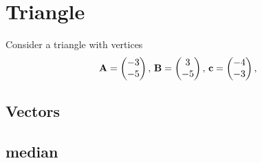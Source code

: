 \documentclass[11pt]{book}
\begin{document}
\frontmatter
\tableofcontents
\setcounter{page}{1}
\mainmatter
\chapter{Triangle}
Consider a triangle with vertices
\begin{align}
\label{eq:tri-pts}
\vec{A}=\myvec{-3 \\ -5},\,
\vec{B}=\myvec{3\\-5},\,
	\vec{c}=\myvec{-4\\-3},\,
\end{align}

\section{Vectors}
\section{median}
\end{document}
